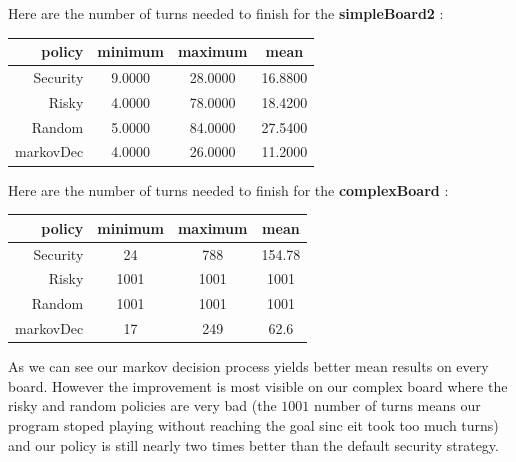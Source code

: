 \documentclass{eplDoc}
\begin{document}
Here are the number of turns needed to finish for the \textbf{simpleBoard2} : 


\begin{center}
		\begin{tabular}{|r|ccc|}
			\hline
			policy & minimum & maximum & mean \\ 
			\hline
			 Security &     9.0000  & 28.0000  & 16.8800 \\
    Risky & 4.0000  & 78.0000 &  18.4200 \\ 
    Random & 5.0000  & 84.0000 &  27.5400 \\ 
    markovDec & 4.0000 &  26.0000  & 11.2000  \\ 
   		\hline
		\end{tabular}
\end{center}

Here are the number of turns needed to finish for the \textbf{complexBoard} : 


\begin{center}
		\begin{tabular}{|r|ccc|}
			\hline  
			policy & minimum & maximum & mean \\ 
			\hline
			 Security &                            24          &             788         &           154.78 \\
       Risky &               1001           &           1001          &            1001 \\ 
       Random &               1001        &             1001             &         1001 \\ 
       markovDec &                 17         &              249             &         62.6 \\ 
 
   		\hline
		\end{tabular}
\end{center}

As we can see our markov decision process yields better mean results on every board. However the improvement is most visible on our complex board where the risky and random policies are very bad (the $1001$ number of turns means our program stoped playing without reaching the goal sinc eit took too much turns) and our policy is still nearly two times better than the default security strategy. 
\end{document}
